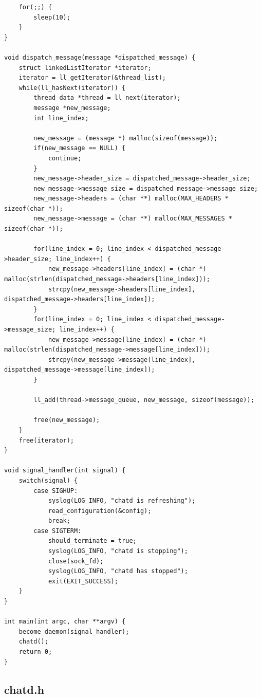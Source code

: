 \documentclass{article}
\begin{document}
\begin{verbatim}
    for(;;) {
        sleep(10);
    }
}

void dispatch_message(message *dispatched_message) {
    struct linkedListIterator *iterator;
    iterator = ll_getIterator(&thread_list);
    while(ll_hasNext(iterator)) {
        thread_data *thread = ll_next(iterator);
        message *new_message;
        int line_index;
        
        new_message = (message *) malloc(sizeof(message));
        if(new_message == NULL) {
            continue;
        }
        new_message->header_size = dispatched_message->header_size;
        new_message->message_size = dispatched_message->message_size;
        new_message->headers = (char **) malloc(MAX_HEADERS * sizeof(char *));
        new_message->message = (char **) malloc(MAX_MESSAGES * sizeof(char *));
        
        for(line_index = 0; line_index < dispatched_message->header_size; line_index++) {
            new_message->headers[line_index] = (char *) malloc(strlen(dispatched_message->headers[line_index]));
            strcpy(new_message->headers[line_index], dispatched_message->headers[line_index]);
        }
        for(line_index = 0; line_index < dispatched_message->message_size; line_index++) {
            new_message->message[line_index] = (char *) malloc(strlen(dispatched_message->message[line_index]));
            strcpy(new_message->message[line_index], dispatched_message->message[line_index]);
        }
        
        ll_add(thread->message_queue, new_message, sizeof(message));
        
        free(new_message);
    }
    free(iterator);
}

void signal_handler(int signal) {
    switch(signal) {
        case SIGHUP:
            syslog(LOG_INFO, "chatd is refreshing");
            read_configuration(&config);
            break;
        case SIGTERM:
            should_terminate = true;
            syslog(LOG_INFO, "chatd is stopping");
            close(sock_fd);
            syslog(LOG_INFO, "chatd has stopped");
            exit(EXIT_SUCCESS);
    }
}

int main(int argc, char **argv) {
    become_daemon(signal_handler);
    chatd();
    return 0;
}

\end{verbatim}

\subsection*{chatd.h}
\end{document}
